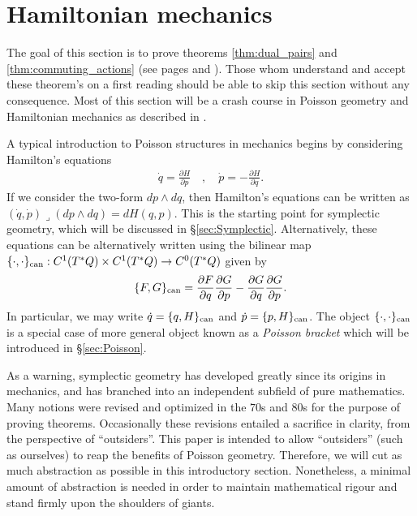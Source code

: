 \documentclass[12pt]{amsart}
\newcommand{\pder}[2]{\ensuremath{\frac{\partial #1}{\partial #2}}}
\begin{document}
\section{Hamiltonian mechanics}
\label{sec:Hamiltonian}
The goal of this section is to prove theorems \ref{thm:dual_pairs}
and \ref{thm:commuting_actions} (see pages \pageref{thm:dual_pairs} and \pageref{thm:commuting_actions}).
Those whom understand and accept these theorem's on a first reading
should be able to skip this section without any consequence.
Most of this section will be a crash course in Poisson geometry
and Hamiltonian mechanics as described in \cite{FOM,MandS,Weinstein1983}.

A typical introduction to Poisson structures in mechanics
begins by considering Hamilton's equations
\begin{align*}
  \dot{q} = \pder{H}{p} \quad, \quad  \dot{p} = - \pder{H}{q}.
\end{align*}
If we consider the two-form $dp \wedge dq$, then Hamilton's equations
can be written as $(\dot{q},\dot{p}) \lrcorner (dp \wedge dq) = dH(q,p)$.
This is the starting point for symplectic geometry, which
will be discussed in \S \ref{sec:Symplectic}.
Alternatively, these equations can be alternatively written using the bilinear map $\{ \cdot , \cdot \}_{\rm can} : C^1( T^*Q) \times C^1(T^*Q) \to C^0(T^*Q)$
given by
\begin{align*}
  \{ F , G \}_{\rm can} = \pder{F}{q}\pder{G}{p} - \pder{G}{q} \pder{G}{p}.
\end{align*}
In particular, we may write $\dot{q} = \{ q , H \}_{\rm can}$ and $\dot{p} = \{ p , H\}_{\rm can}$.
The object $\{ \cdot , \cdot \}_{\rm can}$ is a special case of more general
object known as a \emph{Poisson bracket} which will be introduced in
\S \ref{sec:Poisson}.

As a warning, symplectic geometry has developed greatly
since its origins in mechanics, and
has branched into an independent subfield of pure mathematics.
Many notions were revised and optimized in the $70$s and $80$s for
the purpose of proving theorems.
Occasionally these revisions entailed a sacrifice
in clarity, from the perspective of ``outsiders''.
This paper is intended to allow ``outsiders''
(such as ourselves) to reap the benefits of Poisson geometry.
Therefore, we will cut as much abstraction as possible in this introductory
section.
Nonetheless, a minimal amount of abstraction is needed in order to
maintain mathematical rigour and stand firmly upon the shoulders of giants.
\end{document}

